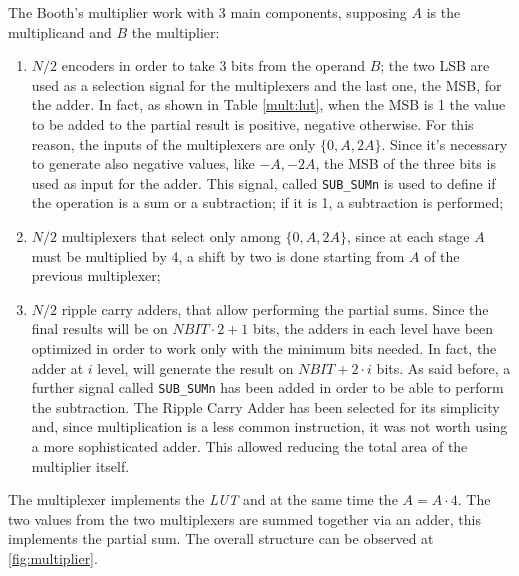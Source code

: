 The Booth's multiplier work with 3 main components, supposing $A$ is the multiplicand and $B$ the multiplier:
\begin{enumerate}
    \item $N/2$ encoders in order to take 3 bits from the operand $B$; the two LSB are used as a selection signal for the multiplexers and the last one, the MSB, for the adder. In fact, as shown in Table \ref{mult:lut}, when the MSB is 1 the value to be added to the partial result is positive, negative otherwise. For this reason, the inputs of the multiplexers are only $\{0, A, 2A\}$. Since it's necessary to generate also negative values, like ${-A, -2A}$, the MSB of the three bits is used as input for the adder. This signal, called \texttt{SUB\_SUMn} is used to define if the operation is a sum or a subtraction; if it is 1, a subtraction is performed;
    \item $N/2$ multiplexers that select only among $\{0, A, 2A\}$, since at each stage $A$ must be multiplied by 4, a shift by two is done starting from $A$ of the previous multiplexer;
    \item $N/2$ ripple carry adders, that allow performing the partial sums. Since the final results will be on $NBIT \cdot 2+1$ bits, the adders in each level have been optimized in order to work only with the minimum bits needed. In fact, the adder at $i$ level, will generate the result on $NBIT + 2 \cdot i$ bits. As said before, a further signal called \texttt{SUB\_SUMn} has been added in order to be able to perform the subtraction. The Ripple Carry Adder has been selected for its simplicity and, since multiplication is a less common instruction, it was not worth using a more sophisticated adder. This allowed reducing the total area of the multiplier itself.
\end{enumerate}
The multiplexer implements the \textit{LUT} and at the same time the $A = A \cdot 4$. The two values from the two multiplexers are summed together via an adder, this implements the partial sum. The overall structure can be observed at \ref{fig:multiplier}.

